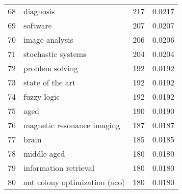 \begin{tabular}{llrr}
68 &                                diagnosis &         217 &      0.0217 \\
69 &                                 software &         207 &      0.0207 \\
70 &                           image analysis &         206 &      0.0206 \\
71 &                       stochastic systems &         204 &      0.0204 \\
72 &                          problem solving &         192 &      0.0192 \\
73 &                         state of the art &         192 &      0.0192 \\
74 &                              fuzzy logic &         192 &      0.0192 \\
75 &                                     aged &         190 &      0.0190 \\
76 &               magnetic resonance imaging &         187 &      0.0187 \\
77 &                                    brain &         185 &      0.0185 \\
78 &                              middle aged &         180 &      0.0180 \\
79 &                    information retrieval &         180 &      0.0180 \\
80 &            ant colony optimization (aco) &         180 &      0.0180 \\
\bottomrule
\end{tabular}
